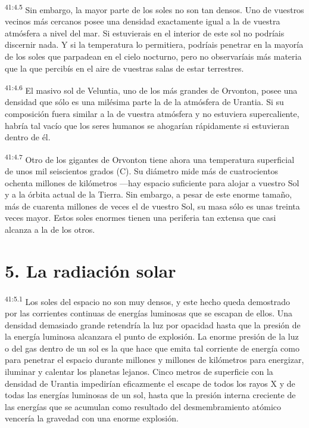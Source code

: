 \par
\textsuperscript{41:4.5} Sin embargo, la mayor parte de los soles no son tan densos. Uno de vuestros vecinos más cercanos posee una densidad exactamente igual a la de vuestra atmósfera a nivel del mar. Si estuvierais en el interior de este sol no podríais discernir nada. Y si la temperatura lo permitiera, podríais penetrar en la mayoría de los soles que parpadean en el cielo nocturno, pero no observaríais más materia que la que percibís en el aire de vuestras salas de estar terrestres.

\par
\textsuperscript{41:4.6} El masivo sol de Veluntia, uno de los más grandes de Orvonton, posee una densidad que sólo es una milésima parte la de la atmósfera de Urantia. Si su composición fuera similar a la de vuestra atmósfera y no estuviera supercaliente, habría tal vacío que los seres humanos se ahogarían rápidamente si estuvieran dentro de él.

\par
\textsuperscript{41:4.7} Otro de los gigantes de Orvonton tiene ahora una temperatura superficial de unos mil seiscientos grados (C). Su diámetro mide más de cuatrocientos ochenta millones de kilómetros ---hay espacio suficiente para alojar a vuestro Sol y a la órbita actual de la Tierra. Sin embargo, a pesar de este enorme tamaño, más de cuarenta millones de veces el de vuestro Sol, su masa sólo es unas treinta veces mayor. Estos soles enormes tienen una periferia tan extensa que casi alcanza a la de los otros.

\section*{5. La radiación solar}
\par
\textsuperscript{41:5.1} Los soles del espacio no son muy densos, y este hecho queda demostrado por las corrientes continuas de energías luminosas que se escapan de ellos. Una densidad demasiado grande retendría la luz por opacidad hasta que la presión de la energía luminosa alcanzara el punto de explosión. La enorme presión de la luz o del gas dentro de un sol es la que hace que emita tal corriente de energía como para penetrar el espacio durante millones y millones de kilómetros para energizar, iluminar y calentar los planetas lejanos. Cinco metros de superficie con la densidad de Urantia impedirían eficazmente el escape de todos los rayos X y de todas las energías luminosas de un sol, hasta que la presión interna creciente de las energías que se acumulan como resultado del desmembramiento atómico vencería la gravedad con una enorme explosión.

